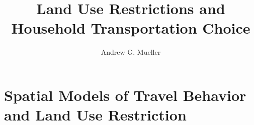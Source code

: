 \documentclass{csuthesis}
\author{Andrew G. Mueller}
\title{Land Use Restrictions and Household Transportation Choice}
\begin{document}
%
%		

		
\mainmatter
		
	
%	
\chapter{Spatial Models of Travel Behavior and Land Use Restriction}



%	
	
	
	
%	
\end{document}
